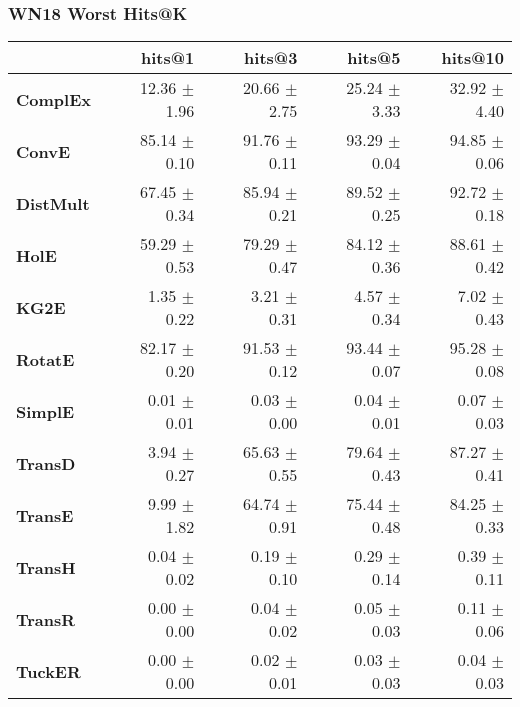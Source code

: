 \documentclass{article}
\begin{document}
\subsubsection{WN18 Worst Hits@K}
    \begin{center}
    \begin{tabular}{lrrrr}
\toprule
{} &        hits@1 &        hits@3 &        hits@5 &       hits@10 \\
\midrule
\textbf{ComplEx } &  12.36 $\pm$ 1.96 &  20.66 $\pm$ 2.75 &  25.24 $\pm$ 3.33 &  32.92 $\pm$ 4.40 \\
\textbf{ConvE   } &  85.14 $\pm$ 0.10 &  91.76 $\pm$ 0.11 &  93.29 $\pm$ 0.04 &  94.85 $\pm$ 0.06 \\
\textbf{DistMult} &  67.45 $\pm$ 0.34 &  85.94 $\pm$ 0.21 &  89.52 $\pm$ 0.25 &  92.72 $\pm$ 0.18 \\
\textbf{HolE    } &  59.29 $\pm$ 0.53 &  79.29 $\pm$ 0.47 &  84.12 $\pm$ 0.36 &  88.61 $\pm$ 0.42 \\
\textbf{KG2E    } &  $\phantom{5}$1.35 $\pm$ 0.22 &  $\phantom{5}$3.21 $\pm$ 0.31 &  $\phantom{5}$4.57 $\pm$ 0.34 &  $\phantom{5}$7.02 $\pm$ 0.43 \\
\textbf{RotatE  } &  82.17 $\pm$ 0.20 &  91.53 $\pm$ 0.12 &  93.44 $\pm$ 0.07 &  95.28 $\pm$ 0.08 \\
\textbf{SimplE  } &  $\phantom{5}$0.01 $\pm$ 0.01 &  $\phantom{5}$0.03 $\pm$ 0.00 &  $\phantom{5}$0.04 $\pm$ 0.01 &  $\phantom{5}$0.07 $\pm$ 0.03 \\
\textbf{TransD  } &  $\phantom{5}$3.94 $\pm$ 0.27 &  65.63 $\pm$ 0.55 &  79.64 $\pm$ 0.43 &  87.27 $\pm$ 0.41 \\
\textbf{TransE  } &  $\phantom{5}$9.99 $\pm$ 1.82 &  64.74 $\pm$ 0.91 &  75.44 $\pm$ 0.48 &  84.25 $\pm$ 0.33 \\
\textbf{TransH  } &  $\phantom{5}$0.04 $\pm$ 0.02 &  $\phantom{5}$0.19 $\pm$ 0.10 &  $\phantom{5}$0.29 $\pm$ 0.14 &  $\phantom{5}$0.39 $\pm$ 0.11 \\
\textbf{TransR  } &  $\phantom{5}$0.00 $\pm$ 0.00 &  $\phantom{5}$0.04 $\pm$ 0.02 &  $\phantom{5}$0.05 $\pm$ 0.03 &  $\phantom{5}$0.11 $\pm$ 0.06 \\
\textbf{TuckER  } &  $\phantom{5}$0.00 $\pm$ 0.00 &  $\phantom{5}$0.02 $\pm$ 0.01 &  $\phantom{5}$0.03 $\pm$ 0.03 &  $\phantom{5}$0.04 $\pm$ 0.03 \\
\bottomrule
\end{tabular}

    \end{center}
\end{document}
